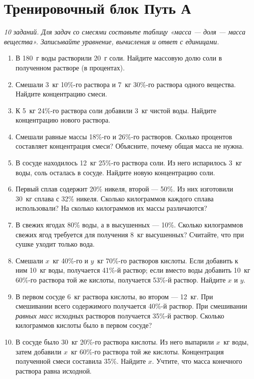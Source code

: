 \documentclass[a4paper,12pt]{article}
\begin{document}
\clearpage
\section*{Тренировочный блок \hfill Путь А}
\textit{10 заданий. Для задач со смесями составьте таблицу «масса --- доля --- масса вещества». Записывайте уравнение, вычисления и ответ с единицами.}
\begin{enumerate}
\item В 180~г воды растворили 20~г соли. Найдите массовую долю соли в полученном растворе (в процентах).
\item Смешали 3~кг 10\%-го раствора и 7~кг 30\%-го раствора одного вещества. Найдите концентрацию смеси.
\item К 5~кг 24\%-го раствора соли добавили 3~кг чистой воды. Найдите концентрацию нового раствора.
\item Смешали равные массы 18\%-го и 26\%-го растворов. Сколько процентов составляет концентрация смеси? Объясните, почему общая масса не нужна.
\item В сосуде находилось 12~кг 25\%-го раствора соли. Из него испарилось 3~кг воды, соль осталась в сосуде. Найдите новую концентрацию соли.
\item Первый сплав содержит 20\% никеля, второй --- 50\%. Из них изготовили 30~кг сплава с 32\% никеля. Сколько килограммов каждого сплава использовали? На сколько килограммов их массы различаются?
\item В свежих ягодах 80\% воды, а в высушенных --- 10\%. Сколько килограммов свежих ягод требуется для получения 8~кг высушенных? Считайте, что при сушке уходит только вода.
\item Смешали \(x\)~кг 40\%-го и \(y\)~кг 70\%-го растворов кислоты. Если добавить к ним 10~кг воды, получается 41\%-й раствор; если вместо воды добавить 10~кг 60\%-го раствора той же кислоты, получается 53\%-й раствор. Найдите \(x\) и \(y\).
\item В первом сосуде 6~кг раствора кислоты, во втором --- 12~кг. При смешивании всего содержимого получается 40\%-й раствор. При смешивании \emph{равных масс} исходных растворов получается 35\%-й раствор. Сколько килограммов кислоты было в первом сосуде?
\item В сосуде было 30~кг 20\%-го раствора кислоты. Из него выпарили \(x\)~кг воды, затем добавили \(x\)~кг 60\%-го раствора той же кислоты. Концентрация полученной смеси составила 35\%. Найдите \(x\). Учтите, что масса конечного раствора равна исходной.
\end{enumerate}
\end{document}
